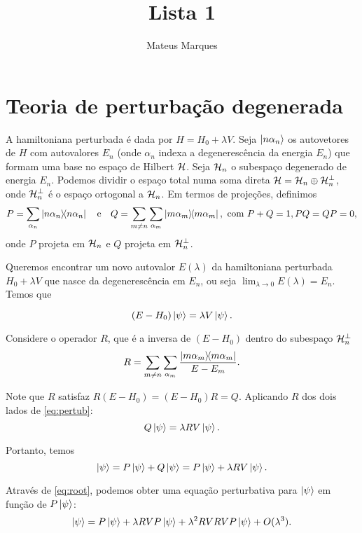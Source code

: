 \documentclass[a4paper,12pt]{article}
\title{\Huge{\textbf{Lista 1}}}
\author{Mateus Marques}
\begin{document}
\maketitle


\section{Teoria de perturbação degenerada}

A hamiltoniana perturbada é dada por $H = H_0 + \lambda V$. Seja $\ket{n \alpha_n}$ os autovetores de $H$ com autovalores $E_n$ (onde $\alpha_n$ indexa a degenerescência da energia $E_n$) que formam uma base no espaço de Hilbert $\mathcal{H}$. Seja $\mathcal{H}_n$ o subespaço degenerado de energia $E_n$. Podemos dividir o espaço total numa soma direta $\mathcal{H} = \mathcal{H}_n \oplus \mathcal{H}_n^\perp$, onde $\mathcal{H}_n^\perp$ é o espaço ortogonal a $\mathcal{H}_n$. Em termos de projeções, definimos
$$
P = \sum_{\alpha_n} \ketbra{n \alpha_n} \quad \mathrm{e} \quad
Q = \sum_{m \neq n} \sum_{\alpha_m} \ketbra{m \alpha_m}, \text{ com }
P + Q = 1, PQ = QP = 0,
$$
onde $P$ projeta em $\mathcal{H}_n$ e $Q$ projeta em $\mathcal{H}_n^\perp$.

Queremos encontrar um novo autovalor $E(\lambda)$ da hamiltoniana perturbada $H_0 + \lambda V$ que nasce da degenerescência em $E_n$, ou seja $\displaystyle{\lim_{\lambda \to 0} E(\lambda) = E_n}$. Temos que

\begin{equation} \label{eq:pertub}
(E - H_0) \ket{\psi} = \lambda V \ket{\psi}.
\end{equation}

Considere o operador $R$, que é a inversa de $(E - H_0)$ dentro do subespaço $\mathcal{H}_n^\perp$
$$
R = \sum_{m \neq n} \sum_{\alpha_m} \frac{\ketbra{m \alpha_m}}{E - E_m}.
$$

Note que $R$ satisfaz $R (E - H_0) = (E - H_0) R = Q$. Aplicando $R$ dos dois lados de \ref{eq:pertub}:
$$
Q \ket{\psi} = \lambda R V \ket{\psi}.
$$

Portanto, temos
\begin{equation} \label{eq:root}
\ket{\psi} = P \ket{\psi} + Q \ket{\psi} =
P \ket{\psi} + \lambda R V \ket{\psi}.
\end{equation}

Através de \ref{eq:root}, podemos obter uma equação perturbativa para $\ket{\psi}$ em função de $P \ket{\psi}$:
\begin{equation} \label{eq:recorr}
\ket{\psi} = P \ket{\psi} + \lambda R V P \ket{\psi} + \lambda^2 R V R V P \ket{\psi} + O(\lambda^3).
\end{equation}
\end{document}
